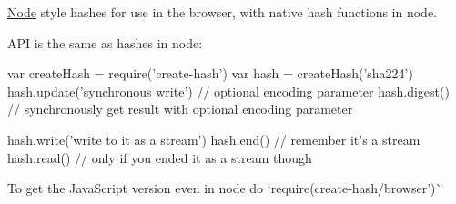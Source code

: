 \href{https://travis-ci.org/crypto-browserify/createHash}{\tt }

\mbox{\hyperlink{classNode}{Node}} style hashes for use in the browser, with native hash functions in node.

A\+PI is the same as hashes in node\+: 
\begin{DoxyCode}
var createHash = require('create-hash')
var hash = createHash('sha224')
hash.update('synchronous write') // optional encoding parameter
hash.digest() // synchronously get result with optional encoding parameter

hash.write('write to it as a stream')
hash.end() // remember it's a stream
hash.read() // only if you ended it as a stream though
\end{DoxyCode}


To get the Java\+Script version even in node do `require(\textquotesingle{}create-\/hash/browser')\`{} 